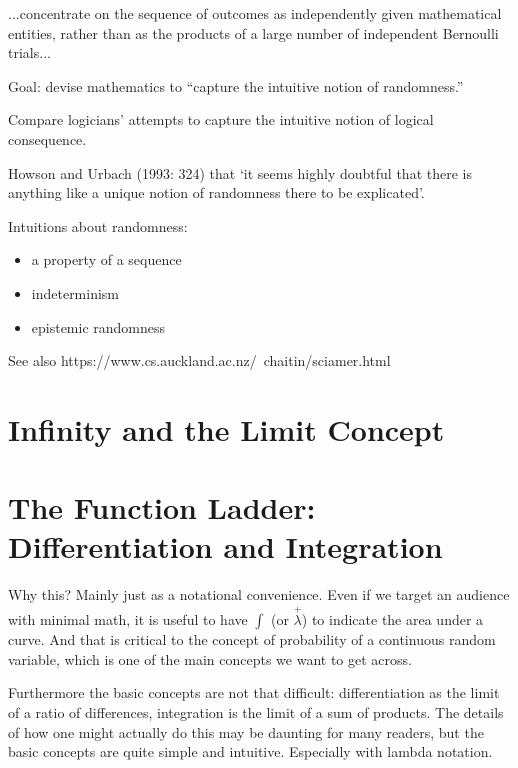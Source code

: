 ...concentrate on the sequence of outcomes as independently given mathematical entities, rather than as the products of a large number of independent Bernoulli trials...


Goal: devise mathematics to ``capture the intuitive notion of randomness.''

Compare logicians' attempts to capture the intuitive notion of logical consequence.

 Howson and Urbach (1993: 324) that ‘it seems highly doubtful that there is anything like a unique notion of randomness there to be explicated’.

Intuitions about randomness:

\begin{itemize}
\item a property of a sequence
\item indeterminism
\item epistemic randomness
\end{itemize}


See also https://www.cs.auckland.ac.nz/~chaitin/sciamer.html

\chapter{Infinity and the Limit Concept}

\chapter{The Function Ladder: Differentiation and Integration}

\begin{remark}
  Why this?  Mainly just as a notational convenience.  Even if we target an
  audience with minimal math, it is useful to have $\int$ (or
  $\overset{+}{\lambda}$) to indicate the area under a curve.  And
  that is critical to the concept of probability of a continuous
  random variable, which is one of the main concepts we want to get
  across.

  Furthermore the basic concepts are not that difficult:
  differentiation as the limit of a ratio of differences, integration
  is the limit of a sum of products.  The details of how one might
  actually do this may be daunting for many readers, but the basic
  concepts are quite simple and intuitive.  Especially with lambda
  notation.
\end{remark}

